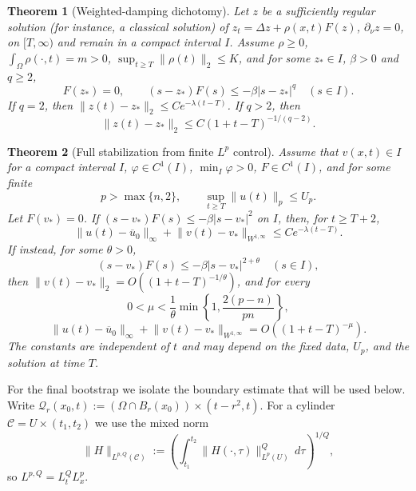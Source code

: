 \documentclass[final,5p,times,twocolumn]{elsarticle}
\newtheorem{theorem}{Theorem}
\newcommand{\Om}{\Omega}
\newcommand{\norm}[1]{\lVert#1\rVert}
\newcommand{\ubar}{\overline u_0}
\begin{document}
\begin{theorem}[Weighted-damping dichotomy]\label{thm:weighted}
Let $z$ be a sufficiently regular solution (for instance, a classical solution) of $z_t=\Delta z+\rho(x,t)F(z)$, $\partial_\nu z=0$, on $[T,\infty)$ and remain in a compact interval $I$. Assume $\rho\ge0$, $\int_\Om\rho(\cdot,t)=m>0$, $\sup_{t\ge T}\norm{\rho(t)}_2\le K$, and for some $z_*\in I$, $\beta>0$ and $q\ge2$,
\begin{equation}\label{dissq}
F(z_*)=0,\qquad (s-z_*)F(s)\le-\beta|s-z_*|^q \quad (s\in I).
\end{equation}
If $q=2$, then $\norm{z(t)-z_*}_2\le Ce^{-\lambda(t-T)}$. If $q>2$, then
\begin{equation}\label{rateweighted}
\norm{z(t)-z_*}_2\le C(1+t-T)^{-1/(q-2)}.
\end{equation}
\end{theorem}

\begin{theorem}[Full stabilization from finite $L^p$ control]\label{thm:full}
Assume that $v(x,t)\in I$ for a compact interval $I$, $\varphi\in C^1(I)$, $\min_I\varphi>0$, $F\in C^1(I)$, and for some finite
\[
p>\max\{n,2\},\qquad \sup_{t\ge T}\norm{u(t)}_p\le U_p.
\]
Let $F(v_*)=0$. If $(s-v_*)F(s)\le-\beta|s-v_*|^2$ on $I$, then, for $t\ge T+2$,
\begin{equation}\label{full-exp}
\norm{u(t)-\ubar}_\infty+\norm{v(t)-v_*}_{W^{1,\infty}}
\le Ce^{-\lambda(t-T)}.
\end{equation}
If instead, for some $\theta>0$,
\begin{equation}\label{deg}
(s-v_*)F(s)\le-\beta|s-v_*|^{2+\theta}\quad(s\in I),
\end{equation}
then $\norm{v(t)-v_*}_2=O((1+t-T)^{-1/\theta})$, and for every
\begin{equation}\label{murange}
0<\mu<\frac1\theta\min\left\{1,\frac{2(p-n)}{pn}\right\},
\end{equation}
\begin{equation}\label{full-alg}
\norm{u(t)-\ubar}_\infty+\norm{v(t)-v_*}_{W^{1,\infty}}
=O((1+t-T)^{-\mu}).
\end{equation}
The constants are independent of $t$ and may depend on the fixed data, $U_p$, and the solution at time $T$.
\end{theorem}

For the final bootstrap we isolate the boundary estimate that will be used below. Write
$\mathcal Q_r(x_0,t):=(\Om\cap B_r(x_0))\times(t-r^2,t)$. For a cylinder $\mathcal C=U\times(t_1,t_2)$ we use the mixed norm
\[
\norm{H}_{L^{p,Q}(\mathcal C)}
:=\left(\int_{t_1}^{t_2}\norm{H(\cdot,\tau)}_{L^p(U)}^Q\,d\tau\right)^{1/Q},
\]
so $L^{p,Q}=L_t^Q L_x^p$.
\end{document}
